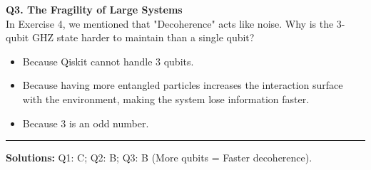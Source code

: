 \documentclass[a4paper,11pt]{article}
\begin{document}
\vspace{0.3cm}

\textbf{Q3. The Fragility of Large Systems}\\
In Exercise 4, we mentioned that "Decoherence" acts like noise. Why is the 3-qubit GHZ state harder to maintain than a single qubit?
\begin{itemize}
    \item[A)] Because Qiskit cannot handle 3 qubits.
    \item[B)] Because having more entangled particles increases the interaction surface with the environment, making the system lose information faster.
    \item[C)] Because 3 is an odd number.
\end{itemize}

\vspace{1cm}
\hrule
\vspace{0.2cm}
\footnotesize{\textbf{Solutions:} Q1: C; Q2: B; Q3: B (More qubits = Faster decoherence).}
\end{document}
